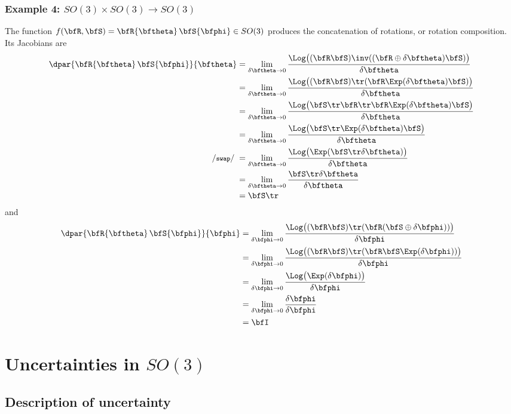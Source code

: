 \subsubsection{Example 4: $SO(3)\times SO(3)\to SO(3)$}

The function $f(\bfR,\bfS) = \bfR\{\bftheta\}\,\bfS\{\bfphi\} \in SO(3)$ produces the concatenation of rotations, or rotation composition. Its Jacobians are
%
\begin{align*}
\dpar{\bfR\{\bftheta\}\,\bfS\{\bfphi\}}{\bftheta} 
&= \lim_{\delta\bftheta\to0}\frac{\Log\big((\bfR\bfS)\inv((\bfR\oplus\delta\bftheta)\bfS)\big)}{\delta\bftheta} \\
&= \lim_{\delta\bftheta\to0}\frac{\Log\big((\bfR\bfS)\tr(\bfR\Exp(\delta\bftheta)\bfS)\big)}{\delta\bftheta} \\
&= \lim_{\delta\bftheta\to0}\frac{\Log\big(\bfS\tr\bfR\tr\bfR\Exp(\delta\bftheta)\bfS\big)}{\delta\bftheta} \\
&= \lim_{\delta\bftheta\to0}\frac{\Log\big(\bfS\tr\Exp(\delta\bftheta)\bfS\big)}{\delta\bftheta} \\
\cswap
&= \lim_{\delta\bftheta\to0}\frac{\Log\big(\Exp(\bfS\tr\delta\bftheta)\big)}{\delta\bftheta} \\
&= \lim_{\delta\bftheta\to0}\frac{\bfS\tr\delta\bftheta}{\delta\bftheta} \\
&= \bfS\tr
\end{align*}
%
and
%
\begin{align*}
\dpar{\bfR\{\bftheta\}\,\bfS\{\bfphi\}}{\bfphi} 
&= \lim_{\delta\bfphi\to0}\frac{\Log\big((\bfR\bfS)\tr(\bfR(\bfS\oplus\delta\bfphi))\big)}{\delta\bfphi} \\
&= \lim_{\delta\bfphi\to0}\frac{\Log\big((\bfR\bfS)\tr(\bfR\bfS\Exp(\delta\bfphi))\big)}{\delta\bfphi} \\
&= \lim_{\delta\bfphi\to0}\frac{\Log\big(\Exp(\delta\bfphi)\big)}{\delta\bfphi} \\
&= \lim_{\delta\bfphi\to0}\frac{\delta\bfphi}{\delta\bfphi} \\
&= \bfI
\end{align*}





\section{Uncertainties in $SO(3)$}

\subsection{Description of uncertainty}
